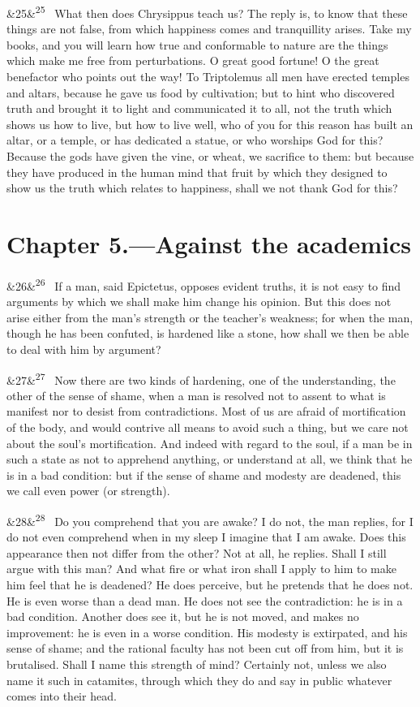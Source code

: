 \documentclass[12pt]{article}
\newcommand{\para}[1][]{\par\noindent\ifx&#1&\else\textsuperscript{\footnotesize #1}~\fi}
\begin{document}
\para[25] What then does Chrysippus teach us? The reply is, to know that these things are not false, from which happiness comes and tranquillity arises. Take my books, and you will learn how true and conformable to nature are the things which make me free from perturbations. O great good fortune! O the great benefactor who points out the way! To Triptolemus all men have erected temples and altars, because he gave us food by cultivation; but to hint who discovered truth and brought it to light and communicated it to all, not the truth which shows us how to live, but how to live well, who of you for this reason has built an altar, or a temple, or has dedicated a statue, or who worships God for this? Because the gods have given the vine, or wheat, we sacrifice to them: but because they have produced in the human mind that fruit by which they designed to show us the truth which relates to happiness, shall we not thank God for this?

\section*{Chapter 5.---Against the academics}

\para[26] If a man, said Epictetus, opposes evident truths, it is not easy to find arguments by which we shall make him change his opinion. But this does not arise either from the man's strength or the teacher's weakness; for when the man, though he has been confuted, is hardened like a stone, how shall we then be able to deal with him by argument?

\para[27] Now there are two kinds of hardening, one of the understanding, the other of the sense of shame, when a man is resolved not to assent to what is manifest nor to desist from contradictions. Most of us are afraid of mortification of the body, and would contrive all means to avoid such a thing, but we care not about the soul's mortification. And indeed with regard to the soul, if a man be in such a state as not to apprehend anything, or understand at all, we think that he is in a bad condition: but if the sense of shame and modesty are deadened, this we call even power (or strength).

\para[28] Do you comprehend that you are awake? I do not, the man replies, for I do not even comprehend when in my sleep I imagine that I am awake. Does this appearance then not differ from the other? Not at all, he replies. Shall I still argue with this man? And what fire or what iron shall I apply to him to make him feel that he is deadened? He does perceive, but he pretends that he does not. He is even worse than a dead man. He does not see the contradiction: he is in a bad condition. Another does see it, but he is not moved, and makes no improvement: he is even in a worse condition. His modesty is extirpated, and his sense of shame; and the rational faculty has not been cut off from him, but it is brutalised. Shall I name this strength of mind? Certainly not, unless we also name it such in catamites, through which they do and say in public whatever comes into their head.
\end{document}
